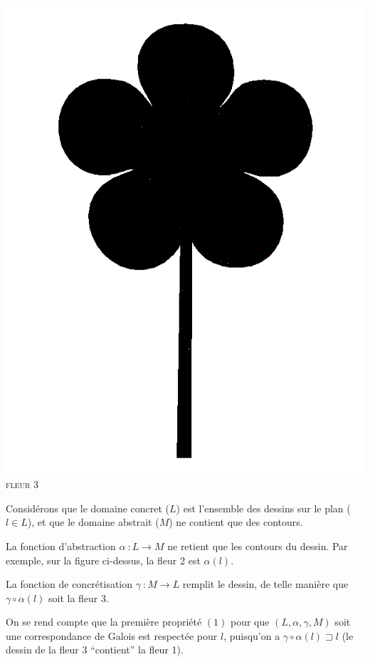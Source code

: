 \documentclass[french]{article}
\begin{document}
\begin{center}
\begin{minipage}{.3\textwidth}
\begin{center}
	\includegraphics[scale=0.19]{./pictures/flower3.png}\\
	\textsc{fleur 3}
      \end{center}
    \end{minipage}
  \end{center}
  
  Considérons que le domaine concret ($L$) est l'ensemble des dessins sur le plan ($l \in L$), et que le domaine abstrait ($M$) ne contient que des contours.
  
  La fonction d'abstraction $\alpha\ : L \rightarrow M$ ne retient que les contours du dessin. Par exemple, sur la figure ci-dessus, la fleur 2 est $\alpha (l)$.

  La fonction de concrétisation $\gamma\ : M \rightarrow L$ remplit le dessin, de telle manière que $\gamma \circ \alpha (l)$  soit la fleur 3.
  
  On se rend compte que la première propriété $(1)$ pour que $(L, \alpha, \gamma, M)$ soit une correspondance de Galois est respectée pour $l$, puisqu'on a $\gamma \circ \alpha (l) \sqsupset l$ (le dessin de la fleur 3 ``contient'' la fleur 1).
  
\end{document}
